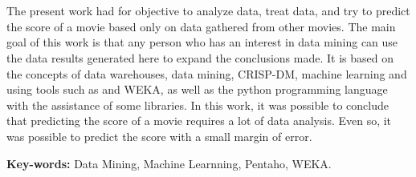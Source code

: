\section*{} 
The present work had for objective to analyze data, treat data, and try to predict the score of a movie based only on data gathered from other movies. The main goal of this work is that any person who has an interest in data mining can use the data results generated here to expand the conclusions made. It is based on the concepts of data warehouses, data mining, CRISP-DM, machine learning and using tools such as \pdi and WEKA, as well as the python programming language with the assistance of some libraries.
In this work, it was possible to conclude that predicting the score of a movie requires a lot of data analysis. Even so, it was possible to predict the score with a small margin of error.


{\bf Key-words:} Data Mining, Machine Learnning, Pentaho, WEKA.